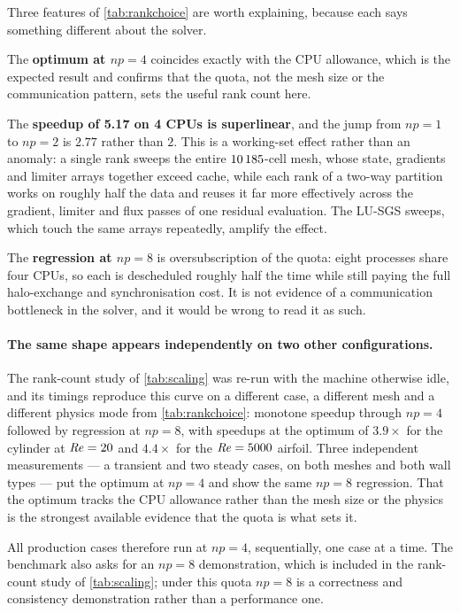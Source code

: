Three features of \cref{tab:rankchoice} are worth explaining, because each says
something different about the solver.

The \textbf{optimum at $np=4$} coincides exactly with the CPU allowance, which is
the expected result and confirms that the quota, not the mesh size or the
communication pattern, sets the useful rank count here.

The \textbf{speedup of 5.17 on 4 CPUs is superlinear}, and the jump from $np=1$ to
$np=2$ is $2.77$ rather than $2$. This is a working-set effect rather than an
anomaly: a single rank sweeps the entire $10\,185$-cell mesh, whose state,
gradients and limiter arrays together exceed cache, while each rank of a
two-way partition works on roughly half the data and reuses it far more
effectively across the gradient, limiter and flux passes of one residual
evaluation. The LU-SGS sweeps, which touch the same arrays repeatedly, amplify the
effect.

The \textbf{regression at $np=8$} is oversubscription of the quota: eight
processes share four CPUs, so each is descheduled roughly half the time while
still paying the full halo-exchange and synchronisation cost. It is not evidence
of a communication bottleneck in the solver, and it would be wrong to read it as
such.

\paragraph{The same shape appears independently on two other configurations.} The
rank-count study of \cref{tab:scaling} was re-run with the machine otherwise idle, and its
timings reproduce this curve on a different case, a different mesh and a different physics
mode from \cref{tab:rankchoice}: monotone speedup through $np=4$ followed by regression at
$np=8$, with speedups at the optimum of $3.9\times$ for the cylinder at $\mathit{Re}=20$ and
$4.4\times$ for the $\mathit{Re}=5000$ airfoil. Three independent measurements --- a transient
and two steady cases, on both meshes and both wall types --- put the optimum at $np=4$ and
show the same $np=8$ regression. That the optimum tracks the CPU allowance rather than the
mesh size or the physics is the strongest available evidence that the quota is what sets
it.

All production cases therefore run at $np=4$, sequentially, one case at a time.
The benchmark also asks for an $np=8$ demonstration, which is included in the
rank-count study of \cref{tab:scaling}; under this quota $np=8$ is a correctness
and consistency demonstration rather than a performance one.

